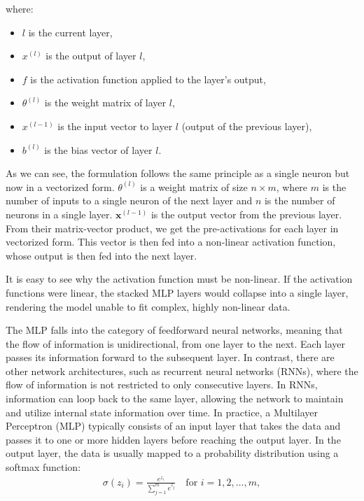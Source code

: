where:
\begin{itemize}
    \item \( l \) is the current layer,
    \item \( x^{(l)} \) is the output of layer \( l \),
    \item \( f \) is the activation function applied to the layer's output,
    \item \( \theta^{(l)} \) is the weight matrix of layer \( l \),
    \item \( x^{(l-1)} \) is the input vector to layer \( l \) (output of the previous layer),
    \item \( b^{(l)} \) is the bias vector of layer \( l \).
\end{itemize}
As we can see, the formulation follows the same principle as a single neuron but now in a vectorized form. 
\( \theta^{(l)}  \) is a weight matrix of size \( n \times m \), where \( m \) is the number of inputs to a single neuron of the next layer and \( n \) is the number of neurons in a single layer.
\( \mathbf{x}^{(l-1)} \) is the output vector from the previous layer.
From their matrix-vector product, we get the pre-activations for each layer in vectorized form.
This vector is then fed into a non-linear activation function, whose output is then fed into the next layer.

It is easy to see why the activation function must be non-linear.
If the activation functions were linear, the stacked MLP layers would collapse into a single layer,
rendering the model unable to fit complex, highly non-linear data.\cite{Goodfellow-et-al-2016}

The MLP falls into the category of feedforward neural networks, meaning that the flow of information is unidirectional,
from one layer to the next. Each layer passes its information forward to the subsequent layer.
In contrast, there are other network architectures, such as recurrent neural networks (RNNs),
where the flow of information is not restricted to only consecutive layers. In RNNs, information can loop back to the same layer, 
allowing the network to maintain and utilize internal state information over time.
In practice, a Multilayer Perceptron (MLP) typically consists of an input layer that takes the data 
and passes it to one or more hidden layers before reaching the output layer.
In the output layer, the data is usually mapped to a probability distribution using a softmax function:
\begin{align}
\sigma(z_i) = \frac{e^{z_i}}{\sum_{j=1}^{m} e^{z_j}} \quad \text{for } i = 1, 2, \ldots, m ,
\end{align}

